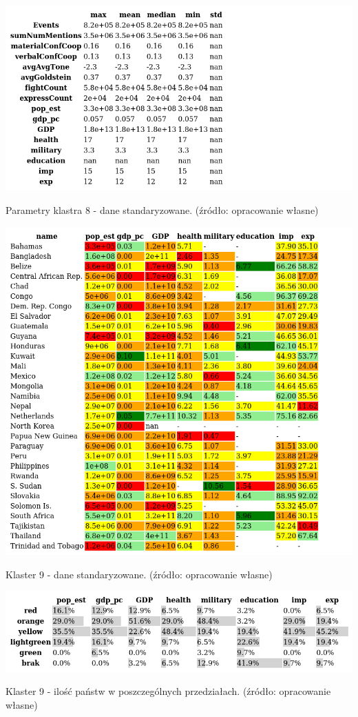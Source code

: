 \documentclass[11pt]{report}
\begin{document}
    \begin{table}[!htp]
        \centering
        \includegraphics[width=\linewidth]{tables/CLUST/desc/clust8std_desc.png}
        \caption{Parametry klastra 8 - dane standaryzowane. (źródło: opracowanie własne)}
        \label{tab:cl8std_desc}
    \end{table}

    \begin{table}[!htp]
        \centering
        \includegraphics[width=\linewidth]{tables/CLUST/cluster9stdkmeans.png}
        \caption{Klaster 9 - dane standaryzowane. (źródło: opracowanie własne)}
        \label{tab:cl9std}
    \end{table}

    \begin{table}[!htp]
        \centering
        \includegraphics[width=\linewidth]{tables/CLUST/cluster9stdkmeanscount.png}
        \caption{Klaster 9 - ilość państw w poszczególnych przedziałach. (źródło: opracowanie własne)}
        \label{tab:cl9stdcount}
    \end{table}
\end{document}
